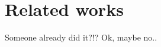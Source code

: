 \chapter[Related works]{Related works}\label{ch:Related}

Someone already did it?!? Ok, maybe no..

